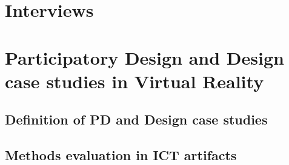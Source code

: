 \section{Interviews}
\section{Participatory Design and Design case studies in Virtual Reality}
\subsection{Definition of PD and Design case studies}
\subsection{Methods evaluation in ICT artifacts}


